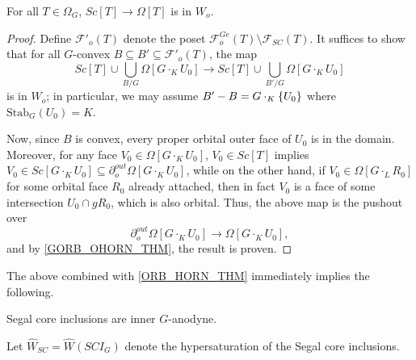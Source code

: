 \documentclass[a4paper,10pt,draft]{article}%
\begin{document}
\begin{proposition}
      \label{SC_IN_OHORN_THM}
      For all $T \in \Omega_G$, $Sc[T] \to \Omega[T]$ is in $W_o$. 
\end{proposition}
\begin{proof}
      Define $\mathscr{F}'_{o}(T)$ denote the poset %
      $\mathscr{F}_{o}^{G e}(T) \setminus \mathscr{F}_{SC}(T)$.
      It suffices to show that for all $G$-convex $B \subseteq B' \subseteq \mathscr{F}'_o(T)$, the map
      \begin{equation}
            Sc[T] \cup \mathop{\bigcup}\limits_{B/G}\Omega[G \cdot_K U_0]
            \to
            Sc[T] \cup \mathop{\bigcup}\limits_{B'/G}\Omega[G \cdot_K U_0]
      \end{equation}
      is in $W_o$; in particular, we may assume $B' - B = G \cdot_K \left\{U_0\right\}$ where $\mathrm{Stab}_G(U_0) = K$.

      Now, since $B$ is convex, every proper orbital outer face of $U_0$ is in the domain.
      Moreover, for any face $V_0 \in \Omega[G \cdot_K U_0]$,
      $V_0 \in Sc[T]$ implies
      $V_0 \in Sc[G \cdot_K U_0] \subseteq \partial^{out}_o\Omega[G \cdot_K U_0]$,
      while on the other hand,
      if $V_0 \in \Omega[G \cdot_L R_0]$ for some orbital face $R_0$ already attached,
      then in fact $V_0$ is a face of some intersection $U_0 \cap g R_0$,
      which is also orbital.
      Thus, the above map is the pushout over
      \begin{equation}
            \partial^{out}_o\Omega[G \cdot_K U_0] \to \Omega[G \cdot_K U_0],
      \end{equation}
      and by \cref{GORB_OHORN_THM}, the result is proven.
\end{proof}

The above combined with \cref{ORB_HORN_THM} immediately implies the following.
\begin{corollary}
      Segal core inclusions are inner $G$-anodyne.
\end{corollary}


\begin{definition}
      Let $\hat{W}_{SC} = \hat{W}(SCI_G)$ denote the hypersaturation of the Segal core inclusions.
\end{definition}
\end{document}
